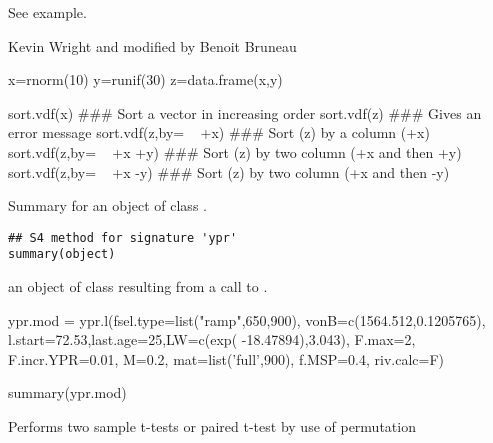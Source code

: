 \documentclass[a4paper]{book}
\begin{document}
%
\begin{Details}\relax
See example.
\end{Details}
%
\begin{Author}\relax
Kevin Wright and modified by Benoit Bruneau
\end{Author}
%
\begin{Examples}
\begin{ExampleCode}
x=rnorm(10)
y=runif(30)
z=data.frame(x,y)

sort.vdf(x)                 ### Sort a vector in increasing order
sort.vdf(z)                 ### Gives an error message
sort.vdf(z,by= ~ +x)        ### Sort (z) by a column (+x)
sort.vdf(z,by= ~ +x +y)     ### Sort (z) by two column (+x and then +y)
sort.vdf(z,by= ~ +x -y)     ### Sort (z) by two column (+x and then -y)
\end{ExampleCode}
\end{Examples}
\newpage
{}
%
\begin{Description}\relax
Summary for an object of class .
\end{Description}
%
\begin{Usage}
\begin{verbatim}
## S4 method for signature 'ypr'
summary(object)
\end{verbatim}
\end{Usage}
%
\begin{Arguments}
\begin{ldescription}
\item[\code{object}] an object of class  resulting from a
call to .

\end{ldescription}
\end{Arguments}
%
\begin{Examples}
\begin{ExampleCode}
ypr.mod = ypr.l(fsel.type=list("ramp",650,900), vonB=c(1564.512,0.1205765), 
                l.start=72.53,last.age=25,LW=c(exp( -18.47894),3.043), F.max=2,
                F.incr.YPR=0.01, M=0.2, mat=list('full',900), f.MSP=0.4, riv.calc=F)  

summary(ypr.mod)
\end{ExampleCode}
\end{Examples}
\newpage
{}
%
\begin{Description}\relax
Performs two sample t-tests  or paired t-test by use of permutation
\end{Description}
\end{document}

